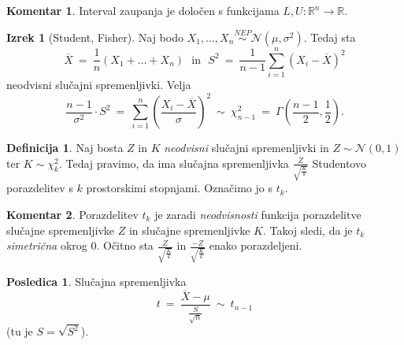 \documentclass[11pt]{article}
\newcommand{\R}{\mathbb{R}}
\newcommand{\1}{\mathbbm{1}}
\newcommand{\n}{\mathcal{N}}
\theoremstyle{definition}
\newtheorem{definicija}{Definicija}[section]
\theoremstyle{definition}
\theoremstyle{definition}
\newtheorem{izrek}{Izrek}[section]
\newtheorem*{posledica}{Posledica}
\newtheorem*{komentar}{Komentar}
\begin{document}
\begin{komentar}

Interval zaupanja je določen s funkcijama $L, U: \R^n \rightarrow \R$.

\end{komentar}
\vspace{0.5cm}

\begin{izrek}[Student, Fisher]

Naj bodo $X_1, \ldots, X_n \overset{NEP}{\sim} \n(\mu, \sigma^2)$. Tedaj sta 
$$\overline{X} ~=~ \frac{1}{n}(X_1 + \ldots + X_n) ~~~\text{in}~~~ S^2 ~=~ \frac{1}{n-1} \sum_{i=1}^n (X_i - \overline{X})^2$$
neodvisni slučajni spremenljivki. Velja
$$\frac{n-1}{\sigma^2} \cdot S^2 ~=~ \sum_{i=1}^n \left( \frac{X_i - \overline{X}}{\sigma} \right)^2  ~\sim~ \chi_{n-1}^2 ~=~ \Gamma\left( \frac{n-1}{2}, \frac{1}{2} \right).$$

\end{izrek}
\vspace{0.5cm}

\begin{definicija}

Naj bosta $Z$ in $K$ \textit{neodvisni} slučajni spremenljivki in \hbox{$Z \sim \n(0, 1)$} ter $K \sim \chi_k^2$. Tedaj pravimo, da ima slučajna spremenljivka $\frac{Z}{\sqrt{\frac{K}{k}}}$ Studentovo porazdelitev s $k$ prostorskimi stopnjami. Označimo jo s $t_k$.

\end{definicija}
\vspace{0.5cm}

\begin{komentar}

Porazdelitev $t_k$ je zaradi \textit{neodvisnosti} funkcija porazdelitve slučajne spremenljivke $Z$ in slučajne spremenljivke $K$. Takoj sledi, da je $t_k$ \textit{simetrična} okrog $0$. Očitno sta $\frac{Z}{\sqrt{\frac{K}{k}}}$ in $\frac{-Z}{\sqrt{\frac{K}{k}}}$ enako porazdeljeni.

\end{komentar}
\vspace{0.5cm}

\begin{posledica}

Slučajna spremenljivka
$$t ~=~ \frac{\overline{X} - \mu}{\frac{S}{\sqrt{n}}} ~\sim~ t_{n-1}$$
(tu je $S = \sqrt{S^2}$).

\end{posledica}
\vspace{0.5cm}
\end{document}
